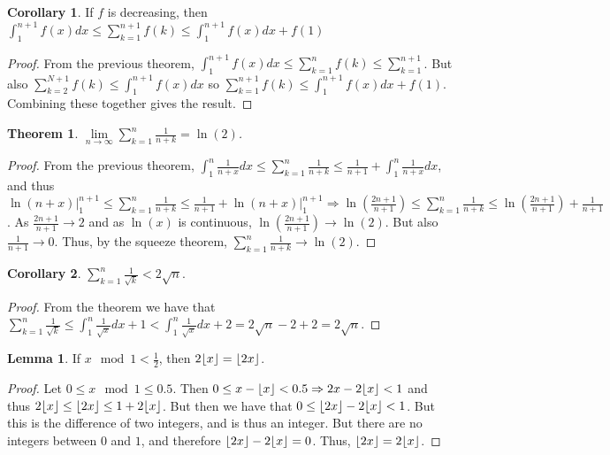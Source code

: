 \documentclass[oneside]{book}
\newtheorem{theorem}{Theorem}[section]
\theoremstyle{definition}
\newtheorem{lemma}{Lemma}[section]
\newtheorem{corollary}{Corollary}[section]
\DeclarePairedDelimiter\floor{\lfloor}{\rfloor}
\begin{document}
\begin{corollary}
If $f$ is decreasing, then $\int_{1}^{n+1} f(x)dx \leq \sum_{k=1}^{n+1} f(k) \leq \int_{1}^{n+1} f(x)dx + f(1)$
\end{corollary}
\begin{proof}
From the previous theorem, $\int_{1}^{n+1}f(x) dx \leq \sum_{k=1}^{n}f(k)\leq \sum_{k=1}^{n+1}$. But also $\sum_{k=2}^{N+1} f(k) \leq \int_{1}^{n+1}f(x)dx$ so $\sum_{k=1}^{n+1}f(k) \leq \int_{1}^{n+1}f(x)dx +f(1)$. Combining these together gives the result.
\end{proof}

\begin{theorem}
$\underset{n\rightarrow \infty}\lim \sum_{k=1}^{n} \frac{1}{n+k} = \ln(2)$.
\end{theorem}
\begin{proof}
From the previous theorem, $\int_{1}^{n} \frac{1}{n+x} dx \leq \sum_{k=1}^{n} \frac{1}{n+k} \leq \frac{1}{n+1} + \int_{1}^{n} \frac{1}{n+x}dx$, and thus $\ln(n+x)\big|_{1}^{n+1} \leq \sum_{k=1}^{n} \frac{1}{n+k}\leq \frac{1}{n+1}+\ln(n+x)\big|_{1}^{n+1}\Rightarrow \ln(\frac{2n+1}{n+1})\leq \sum_{k=1}^{n} \frac{1}{n+k} \leq \ln(\frac{2n+1}{n+1})+\frac{1}{n+1}$. As $\frac{2n+1}{n+1}\rightarrow 2$ and as $\ln(x)$ is continuous, $\ln(\frac{2n+1}{n+1})\rightarrow \ln(2)$. But also $\frac{1}{n+1}\rightarrow 0$. Thus, by the squeeze theorem, $\sum_{k=1}^{n} \frac{1}{n+k} \rightarrow \ln(2)$.
\end{proof}

\begin{corollary}
$\sum_{k=1}^{n}\frac{1}{\sqrt{k}}< 2\sqrt{n}$.
\end{corollary}
\begin{proof}
From the theorem we have that $\sum_{k=1}^{n} \frac{1}{\sqrt{k}} \leq \int_{1}^{n}\frac{1}{\sqrt{x}}dx + 1 < \int_{1}^{n} \frac{1}{\sqrt{x}}dx +2 = 2\sqrt{n}-2+2 = 2\sqrt{n}$.
\end{proof}

\begin{lemma}
If $x\mod 1 < \frac{1}{2}$, then $2\floor{x} = \floor{2x}$.
\end{lemma}
\begin{proof}
Let $0\leq x \mod 1 \leq 0.5$. Then $0 \leq x-\floor{x}<0.5 \Rightarrow 2x-2\floor{x} <1$ and thus $2\floor{x} \leq \floor{2x} \leq 1+2\floor{x}$. But then we have that $0 \leq \floor{2x}-2\floor{x} <1$. But this is the difference of two integers, and is thus an integer. But there are no integers between $0$ and $1$, and therefore $\floor{2x}-2\floor{x} = 0$. Thus, $\floor{2x}=2\floor{x}$.
\end{proof}
\end{document}
